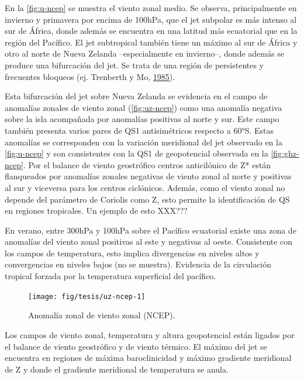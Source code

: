 \documentclass[spanish,a4paper,12pt,oneside]{book}
\begin{document}
En la \autoref{fig:u-ncep} se muestra el viento zonal medio. Se observa,
principalmente en invierno y primavera por encima de 100hPa, que el jet
subpolar es más intenso al sur de África, donde además se encuentra en
una latitud más ecuatorial que en la región del Pacífico. El jet
subtropical también tiene un máximo al sur de África y otro al norte de
Nueva Zelanda --especialmente en invierno--, donde además se produce una
bifurcación del jet. Se trata de una región de persistentes y frecuentes
bloqueos (ej. Trenberth y Mo,
\protect\hyperlink{ref-Trenberth1985}{1985}).

Esta bifurcación del jet sobre Nueva Zelanda se evidencia en el campo de
anomalías zonales de viento zonal (\autoref{fig:uz-ncep}) como una
anomalía negativa sobre la isla acompañada por anomalías positivas al
norte y sur. Este campo también presenta varios pares de QS1
antisimétricos respecto a 60°S. Estas anomalías se corresponden con la
variación meridional del jet observado en la \autoref{fig:u-ncep} y son
consistentes con la QS1 de geopotencial observada en la
\autoref{fig:ghz-ncep}. Por el balance de viento geostrófico centros
anticilónico de Z* están flanqueados por anomalías zonales negativas de
viento zonal al norte y positivas al sur y viceversa para los centros
ciclónicos. Además, como el viento zonal no depende del parámetro de
Coriolis como Z, esto permite la identificación de QS en regiones
tropicales. Un ejemplo de esto XXX???

En verano, entre 300hPa y 100hPa sobre el Pacífico ecuatorial existe una
zona de anomalías del viento zonal positivas al este y negativas al
oeste. Consistente con los campos de temperatura, esto implica
divergencias en niveles altos y convergencias en niveles bajos (no se
muestra). Evidencia de la circulación tropical forzada por la
temperatura superficial del pacífico.

\begin{landscape}\begin{figure}

{\centering \texttt{[image: fig/tesis/uz-ncep-1]} 

}

\caption{Anomalía zonal de viento zonal (NCEP).}\label{fig:uz-ncep}
\end{figure}
\end{landscape}

Los campos de viento zonal, temperatura y altura geopotencial están
ligados por el balance de viento geostrófico y de viento térmico. El
máximo del jet se encuentra en regiones de máxima baroclinicidad y
máximo gradiente meridional de Z y donde el gradiente meridional de
temperatura se anula.
\end{document}
